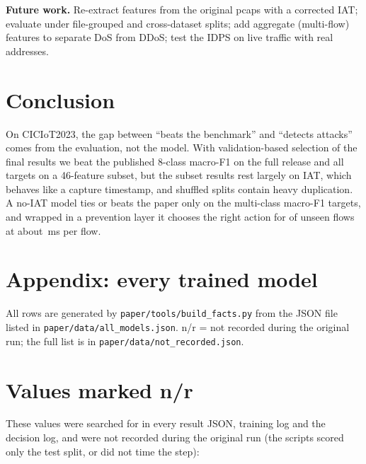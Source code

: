 \documentclass[conference]{IEEEtran}
\begin{document}
\textbf{Future work.} Re-extract features from the original pcaps with a corrected IAT; evaluate under
file-grouped and cross-dataset splits; add aggregate (multi-flow) features to separate DoS from DDoS; test the
IDPS on live traffic with real addresses.

\section{Conclusion}
On CICIoT2023, the gap between ``beats the benchmark'' and ``detects attacks'' comes from the evaluation, not
the model. With validation-based selection of the final results we beat the published 8-class macro-F1 on the full release and all
targets on a 46-feature subset, but the subset results rest largely on IAT, which behaves like a capture
timestamp, and shuffled splits contain heavy duplication. A no-IAT model ties or beats the paper only on the
multi-class macro-F1 targets, and wrapped in a prevention layer it chooses the right action for \idsActAcc{}
of unseen flows at about \idsLatSingle{}\,ms per flow.




\onecolumn
\appendix
\section*{Appendix: every trained model}
All rows are generated by \texttt{paper/tools/build\_facts.py} from the JSON file listed in
\texttt{paper/data/all\_models.json}. n/r = not recorded during the original run; the full list is in \texttt{paper/data/not\_recorded.json}.


\section*{Values marked n/r}
These values were searched for in every result JSON, training log and the decision log, and were not
recorded during the original run (the scripts scored only the test split, or did not time the step):

\end{document}
